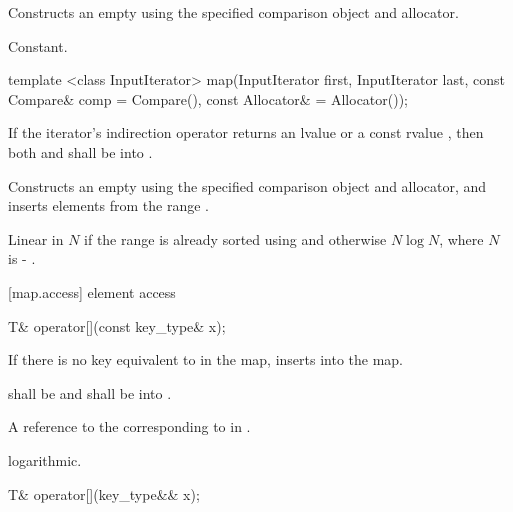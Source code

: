 \begin{itemdescr}
\pnum
\effects
Constructs an empty
using the specified comparison object and allocator.

\pnum
\complexity
Constant.
\end{itemdescr}

%
\begin{itemdecl}
template <class InputIterator>
  map(InputIterator first, InputIterator last,
      const Compare& comp = Compare(), const Allocator& = Allocator());
\end{itemdecl}

\begin{itemdescr}
\pnum
\requires If the iterator's indirection operator returns an lvalue or a
const rvalue , then both
 and  shall be
 into .

\pnum
\effects
Constructs an empty
using the specified comparison object and allocator,
and inserts elements from the range
.

\pnum
\complexity
Linear in $N$ if the range
is already sorted using 
and otherwise $N \log{N}$, where $N$
is  - .
\end{itemdescr}

[map.access]{ element access}

%
\begin{itemdecl}
T& operator[](const key_type& x);
\end{itemdecl}

\begin{itemdescr}
\pnum
\effects
If there is no key equivalent to  in the map, inserts
into the map.

\pnum
\requires {} shall be
 and  shall be
 into .

\pnum
\returns
A reference to the
corresponding to  in
.

\pnum
\complexity
logarithmic.
\end{itemdescr}

%
\begin{itemdecl}
T& operator[](key_type&& x);
\end{itemdecl}

